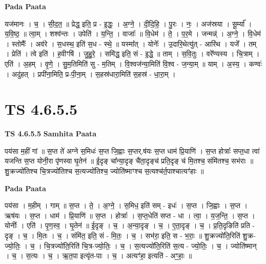\documentclass[17pt]{extarticle}
\begin{document}
\textbf{Pada Paata} \newline

यज॑मानः । च॒ । सी॒द॒त॒ ॥ प्रेद्ध॒ इति॒ प्र - इ॒द्धः॒ । अ॒ग्ने॒ । दी॒दि॒हि॒ । पु॒रः । नः॒ । अज॑स्रया । सू॒र्म्या᳚ । य॒वि॒ष्ठ॒ ॥ त्वा॒म् । शश्व॑न्तः । उपेति॑ । य॒न्ति॒ । वाजाः᳚ ॥ वि॒धेम॑ । ते॒ । प॒र॒मे । जन्मन्न्॑ । अ॒ग्ने॒ । वि॒धेम॑ । स्तोमैः᳚ । अव॑रे । स॒धस्थ॒ इति॑ स॒ध - स्थे॒ ॥ यस्मा᳚त् । योनेः᳚ । उ॒दारि॒थेत्यु॑त् - आरि॑थ । यजे᳚ । तम् । प्रेति॑ । त्वे इति॑ । ह॒वीꣳषि॑ । जु॒हु॒रे॒ । समि॑द्ध॒ इति॒ सं - इ॒द्धे॒ ॥ ताम् । स॒वि॒तुः । वरे᳚ण्यस्य । चि॒त्राम् । एति॑ । अ॒हम् । वृ॒णे॒ । सु॒म॒तिमिति॑ सु - म॒तिम् । वि॒श्वज॑न्या॒मिति॑ वि॒श्व - ज॒न्या॒म् ॥ याम् । अ॒स्य॒ । कण्वः॑ । अदु॑हत् । प्रपी॑ना॒मिति॒ प्र-पी॒ना॒म् । स॒हस्र॑धारा॒मिति॑ स॒हस्र॑ - धा॒रा॒म् ।  \newline





\section{ TS 4.6.5.5 }

\textbf{TS 4.6.5.5 } \newline
\textbf{Samhita Paata} \newline

पय॑सा म॒हीं गां ॥ स॒प्त ते॑ अग्ने स॒मिधः॑ स॒प्त जि॒ह्वाः स॒प्तर्.ष॑यः स॒प्त धाम॑ प्रि॒याणि॑ । स॒प्त होत्राः᳚ सप्त॒धा त्वा॑ यजन्ति स॒प्त योनी॒रा पृ॑णस्वा घृ॒तेन॑ ॥ ई॒दृङ् चा᳚न्या॒दृङ् चै॑ता॒दृङ्च॑ प्रति॒दृङ् च॑ मि॒तश्च॒ संमि॑तश्च॒ सभ॑राः ॥ शु॒क्रज्यो॑तिश्च चि॒त्रज्यो॑तिश्च स॒त्यज्यो॑तिश्च॒ ज्योति॑ष्माꣳश्च स॒त्यश्च॑र्त॒पाश्चात्यꣳ॑हाः ॥ \newline

\textbf{Pada Paata} \newline

पय॑सा । म॒हीम् । गाम् ॥ स॒प्त । ते॒ । अ॒ग्ने॒ । स॒मिध॒ इति॑ सम् - इधः॑ । स॒प्त । जि॒ह्वाः । स॒प्त । ऋष॑यः । स॒प्त । धाम॑ । प्रि॒याणि॑ ॥ स॒प्त । होत्राः᳚ । स॒प्त॒धेति॑ सप्त - धा । त्वा॒ । य॒ज॒न्ति॒ । स॒प्त । योनीः᳚ । एति॑ । पृ॒ण॒स्व॒ । घृ॒तेन॑ ॥ ई॒दृङ् । च॒ । अ॒न्या॒दृङ् । च॒ । ए॒ता॒दृङ् । च॒ । प्र॒ति॒दृङिति॑ प्रति - दृङ् । च॒ । मि॒तः । च॒ । संमि॑त॒ इति॒ सं - मि॒तः॒ । च॒ । सभ॑रा॒ इति॒ स - भ॒राः॒ ॥ शु॒क्रज्यो॑ति॒रिति॑ शु॒क्र-ज्यो॒तिः॒ । च॒ । चि॒त्रज्यो॑ति॒रिति॑ चि॒त्र-ज्यो॒तिः॒ । च॒ । स॒त्यज्यो॑ति॒रिति॑ स॒त्य - ज्यो॒तिः॒ । च॒ । ज्योति॑ष्मान् । च॒ । स॒त्यः । च॒ । ऋ॒त॒पा इत्यृ॑त-पाः । च॒ । अत्यꣳ॑हा॒ इत्यति॑ - अꣳ॒॒हाः॒ ॥  \newline
\end{document}
